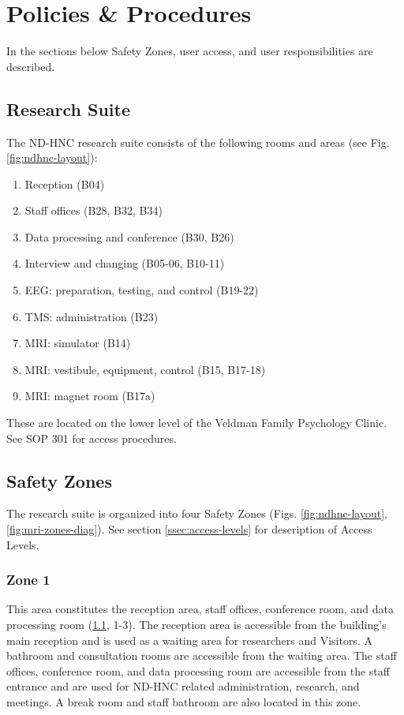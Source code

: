 \documentclass[11pt]{article}
\begin{document}
\section{Policies \& Procedures}

In the sections below Safety Zones, user access, and user responsibilities are described.


\subsection{Research Suite}
\label{ssec:res-suite}

The ND-HNC research suite consists of the following rooms and areas (see Fig. \ref{fig:ndhnc-layout}):

\begin{enumerate}
	\item Reception (B04)
	\item Staff offices (B28, B32, B34)
	\item Data processing and conference (B30, B26)
	\item Interview and changing (B05-06, B10-11)
	\item EEG: preparation, testing, and control (B19-22)
	\item TMS: administration (B23)
	\item MRI: simulator (B14)
	\item MRI: vestibule, equipment, control (B15, B17-18)
	\item MRI: magnet room (B17a)
\end{enumerate}

These are located on the lower level of the Veldman Family Psychology Clinic. See SOP 301 for access procedures.


\subsection{Safety Zones}
\label{ssec:safety-zones}

The research suite is organized into four Safety Zones (Figs. \ref{fig:ndhnc-layout}, \ref{fig:mri-zones-diag}). See section \ref{ssec:access-levels} for description of Access Levels.

\subsubsection{Zone 1}
\label{sssec:safety-zones-1}

This area constitutes the reception area, staff offices, conference room, and data processing room (\ref{ssec:res-suite}, 1-3). The reception area is accessible from the building's main reception and is used as a waiting area for researchers and Visitors. A bathroom and consultation rooms are accessible from the waiting area. The staff offices, conference room, and data processing room are accessible from the staff entrance and are used for ND-HNC related administration, research, and meetings. A break room and staff bathroom are also located in this zone.
\end{document}

